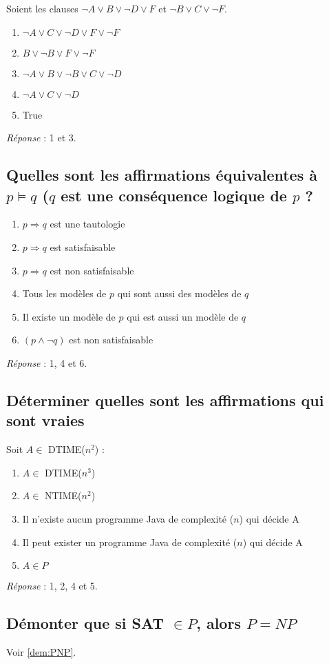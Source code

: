 Soient les clauses $\neg A \vee B \vee \neg D \vee F$ et $\neg B \vee C \vee \neg F$.

\begin{enumerate}
\item $\neg A \vee C \vee \neg D \vee F \vee \neg F$
\item $B \vee \neg B \vee F \vee \neg F$
\item $\neg A \vee B \vee \neg B \vee C \vee \neg D$
\item $\neg A \vee C \vee \neg D$
\item True
\end{enumerate}

\textit{Réponse} : 1 et 3.

\subsection*{Quelles sont les affirmations équivalentes à $p \models q$ ($q$ est une conséquence logique de $p$ ?}

\begin{enumerate}
\item $p \Rightarrow q$ est une tautologie
\item $p \Rightarrow q$ est satisfaisable
\item $p \Rightarrow q$ est non satisfaisable
\item Tous les modèles de $p$ qui sont aussi des modèles de $q$
\item Il existe un modèle de $p$ qui est aussi un modèle de $q$
\item $(p \wedge \neg q)$ est non satisfaisable
\end{enumerate}

\textit{Réponse} : 1, 4 et 6.

\subsection*{Déterminer quelles sont les affirmations qui sont vraies}

Soit $A \in$ DTIME($n^2$) :
\begin{enumerate}
\item $A \in$ DTIME($n^3$)
\item $A \in$ NTIME($n^2$)
\item Il n'existe aucun programme Java de complexité \bigO($n$) qui décide A
\item Il peut exister un programme Java de complexité \bigO($n$) qui décide A
\item $A \in P$
\end{enumerate}

\textit{Réponse} : 1, 2, 4 et 5.

\subsection*{Démonter que si SAT $\in P$, alors $P=NP$}

Voir \ref{dem:PNP}.
